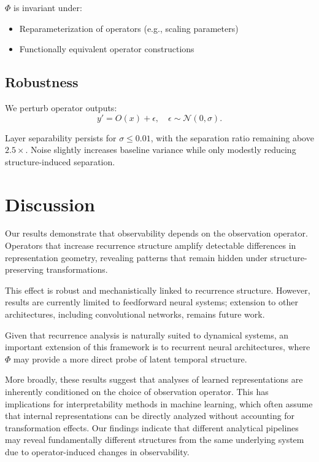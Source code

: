 \documentclass[11pt]{article}
\begin{document}
$\Phi$ is invariant under:
\begin{itemize}
	\item Reparameterization of operators (e.g., scaling parameters)
	\item Functionally equivalent operator constructions
\end{itemize}

\subsection{Robustness}

We perturb operator outputs:
\[
	y' = O(x) + \epsilon, \quad \epsilon \sim \mathcal{N}(0, \sigma).
\]

Layer separability persists for $\sigma \leq 0.01$, with the separation ratio remaining above $2.5\times$. Noise slightly increases baseline variance while only modestly reducing structure-induced separation.

\section{Discussion}

Our results demonstrate that observability depends on the observation operator. Operators that increase recurrence structure amplify detectable differences in representation geometry, revealing patterns that remain hidden under structure-preserving transformations.

This effect is robust and mechanistically linked to recurrence structure. However, results are currently limited to feedforward neural systems; extension to other architectures, including convolutional networks, remains future work.

Given that recurrence analysis is naturally suited to dynamical systems, an important extension of this framework is to recurrent neural architectures, where $\Phi$ may provide a more direct probe of latent temporal structure.

More broadly, these results suggest that analyses of learned representations are inherently conditioned on the choice of observation operator. This has implications for interpretability methods in machine learning, which often assume that internal representations can be directly analyzed without accounting for transformation effects. Our findings indicate that different analytical pipelines may reveal fundamentally different structures from the same underlying system due to operator-induced changes in observability.
\end{document}
